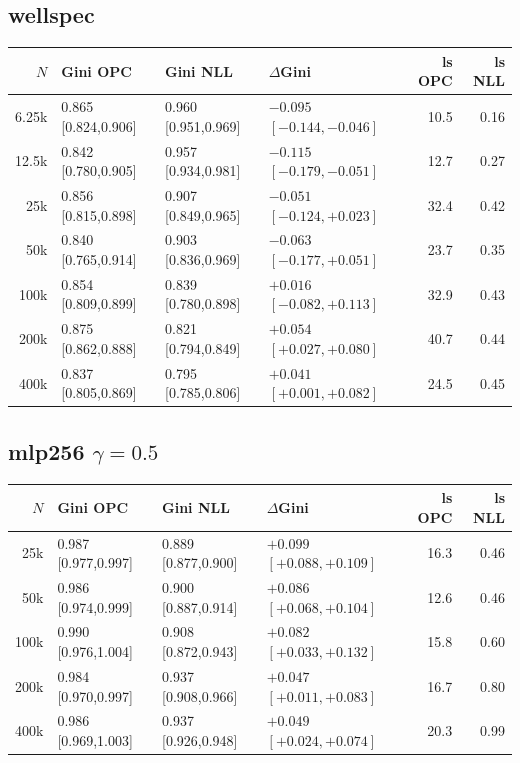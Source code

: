 \documentclass[10pt]{article}
\begin{document}
\subsection*{wellspec}
{\scriptsize
\begin{tabular}{@{}r ll l rr@{}}
\toprule
$N$ & Gini OPC & Gini NLL & $\Delta$Gini & ls OPC & ls NLL \\
\midrule
6.25k & 0.865 [0.824,0.906] & 0.960 [0.951,0.969] & $-0.095$ $[-0.144,-0.046]$ & 10.5 & 0.16 \\
12.5k & 0.842 [0.780,0.905] & 0.957 [0.934,0.981] & $-0.115$ $[-0.179,-0.051]$ & 12.7 & 0.27 \\
25k & 0.856 [0.815,0.898] & 0.907 [0.849,0.965] & $-0.051$ $[-0.124,+0.023]$ & 32.4 & 0.42 \\
50k & 0.840 [0.765,0.914] & 0.903 [0.836,0.969] & $-0.063$ $[-0.177,+0.051]$ & 23.7 & 0.35 \\
100k & 0.854 [0.809,0.899] & 0.839 [0.780,0.898] & $+0.016$ $[-0.082,+0.113]$ & 32.9 & 0.43 \\
200k & 0.875 [0.862,0.888] & 0.821 [0.794,0.849] & $+0.054$ $[+0.027,+0.080]$ & 40.7 & 0.44 \\
400k & 0.837 [0.805,0.869] & 0.795 [0.785,0.806] & $+0.041$ $[+0.001,+0.082]$ & 24.5 & 0.45 \\
\bottomrule
\end{tabular}}

\subsection*{mlp256 $\gamma{=}0.5$}
{\scriptsize
\begin{tabular}{@{}r ll l rr@{}}
\toprule
$N$ & Gini OPC & Gini NLL & $\Delta$Gini & ls OPC & ls NLL \\
\midrule
25k & 0.987 [0.977,0.997] & 0.889 [0.877,0.900] & $+0.099$ $[+0.088,+0.109]$ & 16.3 & 0.46 \\
50k & 0.986 [0.974,0.999] & 0.900 [0.887,0.914] & $+0.086$ $[+0.068,+0.104]$ & 12.6 & 0.46 \\
100k & 0.990 [0.976,1.004] & 0.908 [0.872,0.943] & $+0.082$ $[+0.033,+0.132]$ & 15.8 & 0.60 \\
200k & 0.984 [0.970,0.997] & 0.937 [0.908,0.966] & $+0.047$ $[+0.011,+0.083]$ & 16.7 & 0.80 \\
400k & 0.986 [0.969,1.003] & 0.937 [0.926,0.948] & $+0.049$ $[+0.024,+0.074]$ & 20.3 & 0.99 \\
\bottomrule
\end{tabular}}
\end{document}

